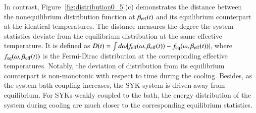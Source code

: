 \documentclass[prl,superscriptaddress,notitlepage,showpacs,twocolumn]{revtex4-2}
\begin{document}
In contrast, Figure~\ref{fig:distribution0_5}(c) demonstrates the distance between the nonequilibrium distribution function at $\beta_{\rm eff}(t)$ and its equilibrium counterpart at the identical temperatures. The distance measures the degree the system statistics deviate from the equilibrium distribution at the same effective temperature. It is defined as $D(t)=\int d\omega |f_{\rm eff}(\omega,\beta_{\rm eff}(t))-f_{\rm eq}(\omega,\beta_{\rm eff}(t))|$, where $f_{\rm eq}(\omega,\beta_{\rm eff}(t))$ is the Fermi-Dirac distribution at the corresponding effective temperatures. Notably, the deviation of distribution from its equilibrium counterpart is non-monotonic with respect to time during the cooling. Besides, as the system-bath coupling increases, the SYK system is driven away from equilibrium. For SYKs weakly coupled to the bath, the energy distribution of the system during cooling are much closer to the corresponding equilibrium statistics.

\end{document}
